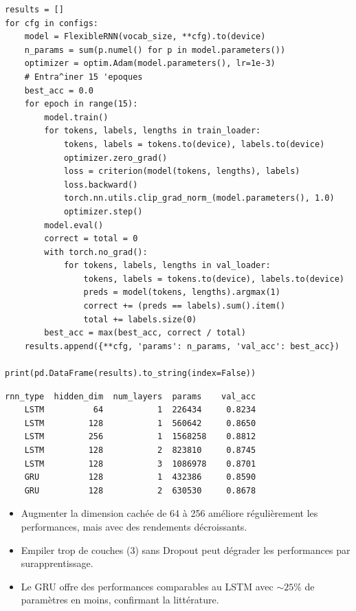\begin{codeblock}[title=\textbf{Ablation : hidden size, couches, LSTM vs GRU}]
\begin{verbatim}
results = []
for cfg in configs:
    model = FlexibleRNN(vocab_size, **cfg).to(device)
    n_params = sum(p.numel() for p in model.parameters())
    optimizer = optim.Adam(model.parameters(), lr=1e-3)
    # Entra^iner 15 'epoques
    best_acc = 0.0
    for epoch in range(15):
        model.train()
        for tokens, labels, lengths in train_loader:
            tokens, labels = tokens.to(device), labels.to(device)
            optimizer.zero_grad()
            loss = criterion(model(tokens, lengths), labels)
            loss.backward()
            torch.nn.utils.clip_grad_norm_(model.parameters(), 1.0)
            optimizer.step()
        model.eval()
        correct = total = 0
        with torch.no_grad():
            for tokens, labels, lengths in val_loader:
                tokens, labels = tokens.to(device), labels.to(device)
                preds = model(tokens, lengths).argmax(1)
                correct += (preds == labels).sum().item()
                total += labels.size(0)
        best_acc = max(best_acc, correct / total)
    results.append({**cfg, 'params': n_params, 'val_acc': best_acc})

print(pd.DataFrame(results).to_string(index=False))
\end{verbatim}
\end{codeblock}

\begin{codeoutput}
\begin{verbatim}
rnn_type  hidden_dim  num_layers  params    val_acc
    LSTM          64           1  226434     0.8234
    LSTM         128           1  560642     0.8650
    LSTM         256           1  1568258    0.8812
    LSTM         128           2  823810     0.8745
    LSTM         128           3  1086978    0.8701
    GRU          128           1  432386     0.8590
    GRU          128           2  630530     0.8678
\end{verbatim}
\end{codeoutput}

\begin{remarque}[Observations]
\begin{itemize}
  \item Augmenter la dimension cach\'ee de 64 \`a 256 am\'eliore r\'eguli\`erement
    les performances, mais avec des rendements d\'ecroissants.
  \item Empiler trop de couches (3) sans Dropout peut d\'egrader les
    performances par surapprentissage.
  \item Le GRU offre des performances comparables au LSTM avec $\sim 25\%$ de
    param\`etres en moins, confirmant la litt\'erature.
\end{itemize}
\end{remarque}


